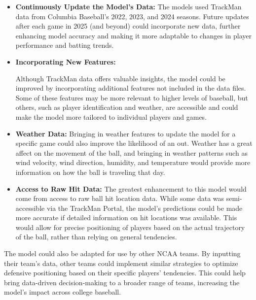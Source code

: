 \documentclass{article}
\begin{document}
\begin{itemize}
    \item \textbf{Continuously Update the Model's Data:} 
    The models used TrackMan data from Columbia Baseball's 2022, 2023, and 2024 \cite{trackman2022}\cite{trackman2022}\cite{trackman2024} seasons. Future updates after each game in 2025 (and beyond) could incorporate new data, further enhancing model accuracy and making it more adaptable to changes in player performance and batting trends.
    
    \item \textbf{Incorporating New Features:} 
    
    Although TrackMan data offers valuable insights, the model could be improved by incorporating additional features not included in the data files. Some of these features may be more relevant to higher levels of baseball, but others, such as player identification and weather, are accessible and could make the model more tailored to individual players and games.

    
    \item \textbf{Weather Data:} 
    Bringing in weather features to update the model for a specific game could also improve the likelihood of an out. Weather has a great affect on the movement of the ball, and bringing in weather patterns such as wind velocity, wind direction, humidity, and temperature would provide more information on how the ball is traveling that day. \cite{mlb2023windimpact}

    
    \item \textbf{Access to Raw Hit Data:} 
    The greatest enhancement to this model would come from access to raw ball hit location data. While some data was semi-accessible via the TrackMan Portal, the model’s predictions could be made more accurate if detailed information on hit locations was available. This would allow for precise positioning of players based on the actual trajectory of the ball, rather than relying on general tendencies.\cite{mlbsavant2023fielderpositioning} \cite{mlbsavant2023field} \cite{mlbsavant2023catchprobability} 
\end{itemize}

 
 The model could also be adapted for use by other NCAA teams. By inputting their team's data, other teams could implement similar strategies to optimize defensive positioning based on their specific players' tendencies. This could help bring data-driven decision-making to a broader range of teams, increasing the model's impact across college baseball.
\end{document}
